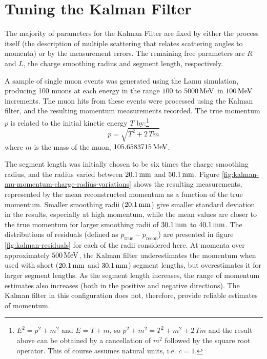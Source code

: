 \section{Tuning the Kalman Filter}\label{sec:kalman-tuning}
The majority of parameters for the Kalman Filter are fixed by either the process itself (the description of multiple scattering that relates scattering angles to momenta) or by the measurement errors. The remaining free parameters are $R$ and $L$, the charge smoothing radius and segment length, respectively.

A sample of single muon events was generated using the Lamu simulation, producing 100 muons at each energy in the range $100$ to $5000\,\mathrm{MeV}$ in $100\,\mathrm{MeV}$ increments. The muon hits from these events were processed using the Kalman filter, and the resulting momentum measurements recorded. The true momentum $p$ is related to the initial kinetic energy $T$ by:\footnote{$E^2 = p^2+m^2$ and $E = T + m$, so $p^2 + m^2 = T^2 + m^2 + 2\,T m$ and the result above can be obtained by a cancellation of $m^2$ followed by the square root operator. This of course assumes natural units, i.e. $c=1$.}
\begin{equation}\label{eqn:momentum-kinetic-energy-relationship}
p = \sqrt{T^2 + 2\,T m}
\end{equation}
where $m$ is the mass of the muon, $105.6583715\,\mathrm{MeV}$\citep{PDG2011}.

The segment length was initially chosen to be six times the charge smoothing radius, and the radius varied between $20.1\,\mathrm{mm}$ and $50.1\,\mathrm{mm}$. Figure \ref{fig:kalman-mu-momentum-charge-radius-variations} shows the resulting measurements, represented by the mean reconstructed momentum as a function of the true momentum. Smaller smoothing radii ($20.1\,\mathrm{mm}$) give smaller standard deviation in the results, especially at high momentum, while the mean values are closer to the true momentum for larger smoothing radii of $30.1\,\mathrm{mm}$ to $40.1\,\mathrm{mm}$. The distributions of residuals (defined as $p_{\mathrm{true}} - p_{\mathrm{recon}}$) are presented in figure \ref{fig:kalman-residuals} for each of the radii considered here. At momenta over approximately $500\,\mathrm{MeV}$, the Kalman filter underestimates the momentum when used with short ($20.1\,\mathrm{mm}$ and $30.1\,\mathrm{mm}$) segment lengths, but overestimates it for larger segment lengths. As the segment length increases, the range of momentum estimates also increases (both in the positive and negative directions). The Kalman filter in this configuration does not, therefore, provide reliable estimates of momentum.

